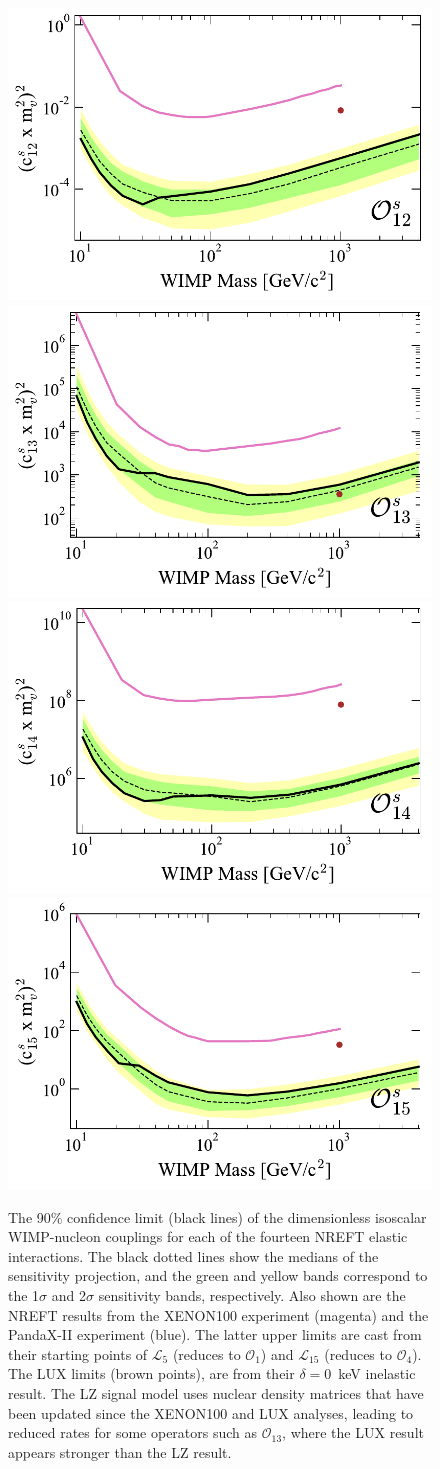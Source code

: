 \documentclass[reprint, showpacs,
preprintnumbers,
amsmath,amssymb,
aps, floatfix,
superscriptaddress,
prd, nofootinbib]{revtex4-1}
\begin{document}
\begin{figure}
    \includegraphics[width=0.5\columnwidth]{SR1_EFT_O12s_c2_lim_Comparison}
    \includegraphics[width=0.5\columnwidth]{SR1_EFT_O13s_c2_lim_Comparison}
    \includegraphics[width=0.5\columnwidth]{SR1_EFT_O14s_c2_lim_Comparison}
    \includegraphics[width=0.5\columnwidth]{SR1_EFT_O15s_c2_lim_Comparison}
    \caption{
    The 90\% confidence limit (black lines) of the dimensionless isoscalar WIMP-nucleon couplings for each of the fourteen NREFT elastic interactions.
    The black dotted lines show the medians of the sensitivity projection, and the green and yellow bands correspond to the 1$\sigma$ and 2$\sigma$ sensitivity bands, respectively.
    Also shown are the NREFT results from the XENON100 experiment (magenta) and the PandaX-II experiment (blue).
    The latter upper limits are cast from their starting points of $\mathcal{L}_5$ (reduces to $\mathcal{O}_1$) and $\mathcal{L}_{15}$ (reduces to $\mathcal{O}_4$).
    The LUX limits (brown points), are from their $\delta=0$~keV inelastic result.
    The LZ signal model uses nuclear density matrices that have been updated since the XENON100 and LUX analyses, leading to reduced rates for some operators such as $\mathcal{O}_{13}$, where the LUX result appears stronger than the LZ result. 
    }
  \label{fig:limits-elastic-s}
\end{figure}
\end{document}
